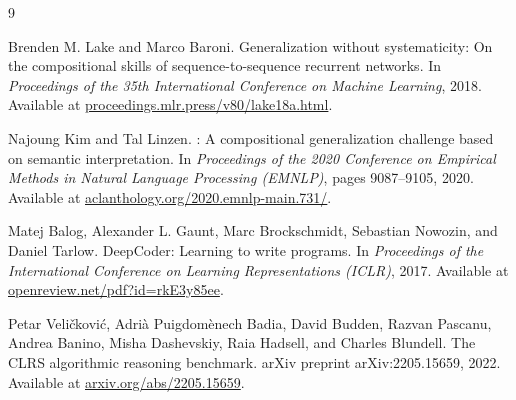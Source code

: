 \documentclass[11pt]{article}
\begin{document}
\begin{thebibliography}{9}

Brenden M. Lake and Marco Baroni.
\newblock Generalization without systematicity: On the compositional skills of sequence-to-sequence recurrent networks.
\newblock In \emph{Proceedings of the 35th International Conference on Machine Learning}, 2018.
\newblock Available at \href{https://proceedings.mlr.press/v80/lake18a.html}{proceedings.mlr.press/v80/lake18a.html}.

Najoung Kim and Tal Linzen.
: A compositional generalization challenge based on semantic interpretation.
\newblock In \emph{Proceedings of the 2020 Conference on Empirical Methods in Natural Language Processing (EMNLP)}, pages 9087--9105, 2020.
\newblock Available at \href{https://aclanthology.org/2020.emnlp-main.731/}{aclanthology.org/2020.emnlp-main.731/}.

Matej Balog, Alexander L. Gaunt, Marc Brockschmidt, Sebastian Nowozin, and Daniel Tarlow.
\newblock DeepCoder: Learning to write programs.
\newblock In \emph{Proceedings of the International Conference on Learning Representations (ICLR)}, 2017.
\newblock Available at \href{https://openreview.net/pdf?id=rkE3y85ee}{openreview.net/pdf?id=rkE3y85ee}.

Petar Veli\v{c}kovi\'{c}, Adri\`{a} Puigdom\`{e}nech Badia, David Budden, Razvan Pascanu, Andrea Banino, Misha Dashevskiy, Raia Hadsell, and Charles Blundell.
\newblock The {CLRS} algorithmic reasoning benchmark.
\newblock arXiv preprint arXiv:2205.15659, 2022.
\newblock Available at \href{https://arxiv.org/abs/2205.15659}{arxiv.org/abs/2205.15659}.

\end{thebibliography}
\end{document}
